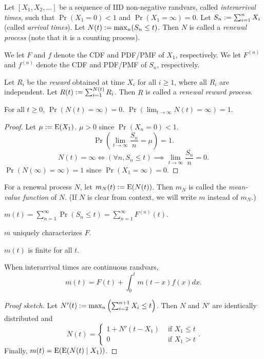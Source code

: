 \documentclass[a4paper, 12pt, fleqn]{article}
\begin{document}
\begin{definition}
Let $[X_1, X_2, \ldots]$ be a sequence of IID non-negative randvars, called \emph{interarrival times},
such that $\Pr(X_1 = 0) < 1$ and $\Pr(X_1 = \infty) = 0$.
Let $S_n := \sum_{i=1}^n X_i$ (called \emph{arrival times}). Let $N(t) := \max_n (S_n \le t)$.
Then $N$ is called a \emph{renewal process} (note that it is a counting process).

We let $F$ and $f$ denote the CDF and PDF/PMF of $X_1$, respectively.
We let $F^{(n)}$ and $f^{(n)}$ denote the CDF and PDF/PMF of $S_n$, respectively.

Let $R_i$ be the \emph{reward} obtained at time $X_i$ for all $i \ge 1$,
where all $R_i$ are independent. Let $R(t) := \sum_{i=1}^{N(t)} R_i$.
Then $R$ is called a \emph{renewal reward process}.
\end{definition}

\begin{lemma}
For all $t \ge 0$, $\Pr(N(t) = \infty) = 0$. $\Pr(\lim_{t \to \infty} N(t) = \infty) = 1$.
\end{lemma}
\begin{proof}
Let $\mu := \operatorname*{E}(X_1)$. $\mu > 0$ since $\Pr(X_n = 0) < 1$.
\[ \Pr\left(\lim_{t \to \infty} \frac{S_n}{n} = \mu\right) = 1.  \tag{strong law of large numbers} \]
\[ N(t) = \infty \iff (\forall n, S_n \le t) \implies \lim_{t \to \infty} \frac{S_n}{n} = 0. \]
$\Pr(N(\infty) = \infty) = 1$ since $\Pr(X_1 = \infty) = 0$.
\end{proof}

\begin{definition}
For a renewal process $N$, let $m_N(t) := \operatorname*{E}(N(t))$.
Then $m_N$ is called the \emph{mean-value function} of $N$.
(If $N$ is clear from context, we will write $m$ instead of $m_N$.)
\end{definition}

\begin{lemma}
$m(t) = \sum_{n=1}^{\infty} \Pr(S_n \le t) = \sum_{n=1}^{\infty} F^{(n)}(t)$.
\end{lemma}

\begin{theorem}
$m$ uniquely characterizes $F$.
\end{theorem}

\begin{lemma}
$m(t)$ is finite for all $t$.
\end{lemma}

\begin{theorem}
When interarrival times are continuous randvars,
\[ m(t) = F(t) + \int_0^t m(t-x)f(x)dx. \]
\end{theorem}
\begin{proof}[Proof sketch]
Let $N'(t) := \max_n \left( \sum_{i=2}^{n+1} X_i \le t \right)$.
Then $N$ and $N'$ are identically distributed and
\[ N(t) = \begin{cases} 1 + N'(t-X_1) & \textrm{ if } X_1 \le t
\\ 0 & \textrm{ if } X_1 > t \end{cases}. \]
Finally, $m(t) = \operatorname*{E}(\operatorname*{E}(N(t) \mid X_1))$.
\end{proof}
\end{document}
